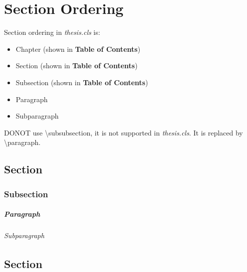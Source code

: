 \chapter{Section Ordering}
\label{chapter:secorder}

Section ordering in \textit{thesis.cls} is:
\begin{itemize}
\item Chapter (shown in \textbf{Table of Contents})
\item Section (shown in \textbf{Table of Contents})
\item Subsection (shown in \textbf{Table of Contents})
\item Paragraph
\item Subparagraph
\end{itemize}
DONOT use \textbackslash subsubsection, it is not supported in \textit{thesis.cls}.
It is replaced by \textbackslash paragraph.

\section{Section}
\label{sec:secorder}
\lipsum[1-2]  %

\subsection{Subsection}
\label{subsec:secorder}
\lipsum[3-4]  %

\paragraph{Paragraph}
\lipsum[5-6]  %

\subparagraph{Subparagraph}
\lipsum[7]  %

\section{Section}
\label{sec:secorder}
\lipsum[8]  %
